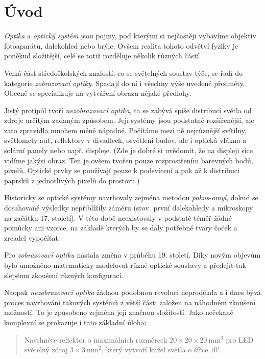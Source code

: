 \chapter{Úvod}

\emph{Optika} a \emph{optický systém} jsou pojmy, pod kterými si nejčastěji vybavíme objektiv fotoaparátu, dalekohled nebo brýle. Ovšem realita tohoto odvětví fyziky je poněkud složitější, celé se totiž rozděluje několik různých částí.

Velká část středoškolských znalostí, co se světelných soustav týče, se řadí do kategorie \emph{zobrazovací optiky}. Spadají do ní i všechny výše uvedené předměty. Obecně se specializuje na vytváření obrazu nějaké předlohy.

Jistý protipól tvoří \emph{nezobrazovací optika}, ta se zabývá spíše distribucí světla od zdroje určitým zadaným způsobem. Její systémy jsou podstatně rozšířenější, ale zato zpravidla mnohem méně nápadné. Počítáme mezi ně nejrůznější svítilny, světlomety aut, reflektory v divadlech, osvětlení budov, ale i optická vlákna a solární panely nebo např. displeje. (Zde je dobré si uvědomit, že na displeji sice vidíme jakýsi obraz. Ten je ovšem tvořen pouze rozprostřením barevných bodů, pixelů. Optické prvky se používají pouze k podsvícení a pak až k distribuci paprsků z jednotlivých pixelů do prostoru.)

Historicky se optické systémy navrhovaly zejména metodou \emph{pokus-omyl}, dokud se dosahované výsledky nepřiblížily záměru (srov. první dalekohledy a mikroskopy na začátku 17. století). V této době neexistovaly v podstatě téměř žádné pomůcky ani vzorce, na základě kterých by se daly potřebné tvary čoček a zrcadel vypočítat. 

Pro \emph{zobrazovací optiku} nastala změna v průběhu 19. století. Díky novým objevům bylo umožněno matematicky modelovat různé optické soustavy a předejít tak slepému zkoušení různých konfigurací.\src

Naopak \emph{nezobrazovací optika} žádnou podobnou revoluci neprodělala a i dnes bývá proces navrhování takových systémů z větší části založen na náhodném zkoušení možností. To je způsobeno zejména její značnou složitostí. Jako nečekaně komplexní se prokazuje i tato základní úloha:

\begin{quote}
    Navrhněte reflektor o maximálních rozměrech $20\times20\times20\ \mathrm{mm^3}$ pro LED světelný zdroj $3\times3\ \mathrm{mm^2}$, který vytvoří kužel světla o šířce $10^{\circ}$.
\end{quote}

